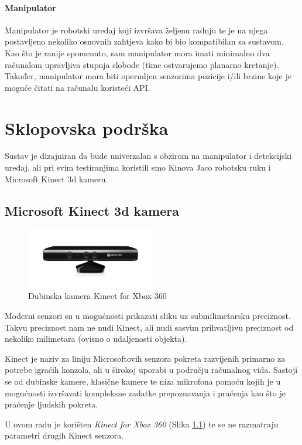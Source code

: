 \documentclass[times, utf8, diplomski, numeric]{fer}
\begin{document}
\subsubsection{Manipulator}
Manipulator je robotski uređaj koji izvršava željenu radnju te je na njega postavljeno nekoliko osnovnih zahtjeva kako bi bio kompatibilan sa sustavom.
Kao što je ranije spomenuto, sam manipulator mora imati minimalno dva računalom upravljiva stupnja slobode (time ostvarujemo planarno kretanje).
Također, manipulator mora biti opermljen senzorima pozicije i/ili brzine koje je moguće čitati na računalu koristeći API.

\chapter{Sklopovska podrška}
Sustav je dizajniran da bude univerzalan s obzirom na manipulator i detekcijski uređaj, ali pri svim testiranjima koristili smo Kinova Jaco robotsku ruku i Microsoft Kinect 3d kameru.
\section{Microsoft Kinect 3d kamera}\label{sec:kinect}
\begin{figure}[h!]
    \centering
    \includegraphics[width=0.5\textwidth]{detekcija/kinect}
	\caption{Dubinska kamera Kinect for Xbox 360}
	\label{fig:kinect}
\end{figure}

Moderni senzori su u mogućnosti prikazati sliku uz submilimetarsku preciznost. Takvu preciznost nam ne nudi Kinect, ali nudi sasvim prihvatljivu preciznost od nekoliko milimetara (ovisno o udaljenosti objekta).

Kinect je naziv za liniju Microsoftovih senzora pokreta razvijenih primarno za potrebe igraćih konzola, ali u širokoj uporabi u području računalnog vida. Sastoji se od dubinske kamere, klasične kamere te niza mikrofona pomoću kojih je u mogućnosti izvršavati kompleksne zadatke prepoznavanja i praćenja kao što je praćenje ljudskih pokreta.

U ovom radu je korišten \textit{Kinect for Xbox 360} \cite{kinect} (Slika \ref{fig:kinect}) te se ne razmatraju parametri drugih Kinect senzora.
\end{document}
